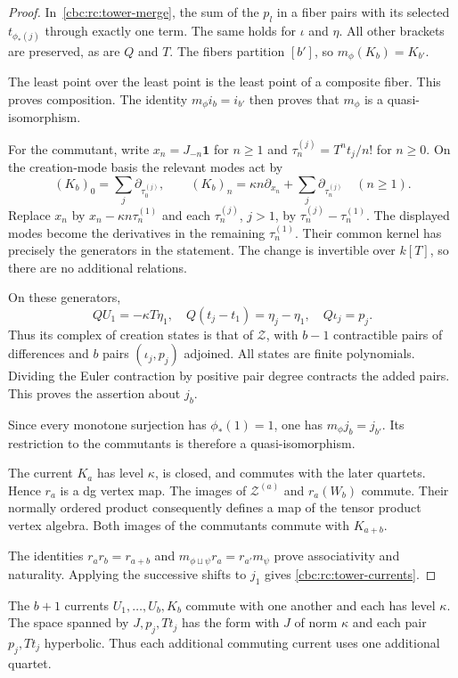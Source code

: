 \begin{proof}
In~\eqref{cbc:rc:tower-merge}, the sum of the $p_l$ in a fiber
pairs with its selected $t_{\phi_*(j)}$ through exactly one term.
The same holds for $\iota$ and $\eta$. All other brackets are
preserved, as are $Q$ and $T$. The fibers partition $[b']$, so
$m_\phi(K_b)=K_{b'}$.

The least point over the least point is the
least point of a composite fiber. This proves composition.
The identity $m_\phi i_b=i_{b'}$ then proves that $m_\phi$ is a
quasi-isomorphism.

For the commutant, write $x_n=J_{-n}\mathbf1$ for $n\geq1$ and
$\tau_n^{(j)}=T^nt_j/n!$ for $n\geq0$. On the creation-mode
basis the relevant modes act by
\[
 (K_b)_0=\sum_j\partial_{\tau_0^{(j)}},\qquad
 (K_b)_n=\kappa n\partial_{x_n}
                  +\sum_j\partial_{\tau_n^{(j)}}\quad(n\geq1).
\]
Replace $x_n$ by $x_n-\kappa n\tau_n^{(1)}$ and each
$\tau_n^{(j)}$, $j>1$, by $\tau_n^{(j)}-\tau_n^{(1)}$.
The displayed modes become the derivatives in the remaining
$\tau_n^{(1)}$. Their common kernel has precisely the generators
in the statement. The change is invertible over $k[T]$, so there
are no additional relations.

On these generators,
\[
 QU_1=-\kappa T\eta_1,
 \quad Q(t_j-t_1)=\eta_j-\eta_1,
 \quad Q\iota_j=p_j.
\]
Thus its complex of creation states is that of $\mathcal Z$,
with $b-1$ contractible pairs of differences and $b$ pairs
$(\iota_j,p_j)$ adjoined. All states are finite polynomials.
Dividing the Euler contraction by positive pair degree contracts
the added pairs. This proves the assertion about $j_b$.

Since every monotone surjection has $\phi_*(1)=1$, one has
$m_\phi j_b=j_{b'}$. Its restriction to the commutants is
therefore a quasi-isomorphism.

The current $K_a$ has level $\kappa$, is closed, and commutes
with the later quartets. Hence $r_a$ is a dg vertex map.
The images of $\mathcal Z^{(a)}$ and $r_a(W_b)$ commute.
Their normally ordered product consequently defines a map of
the tensor product vertex algebra. Both images of the
commutants commute with $K_{a+b}$.

The identities
$r_ar_b=r_{a+b}$ and
$m_{\phi\sqcup\psi}r_a=r_{a'}m_\psi$ prove associativity
and naturality. Applying the successive shifts to $j_1$ gives
\eqref{cbc:rc:tower-currents}.
\end{proof}

The $b+1$ currents $U_1,\ldots,U_b,K_b$ commute with one another
and each has level $\kappa$. The space spanned by $J,p_j,Tt_j$
has the form with $J$ of norm $\kappa$ and each pair $p_j,Tt_j$
hyperbolic. Thus each additional commuting current uses one
additional quartet.

